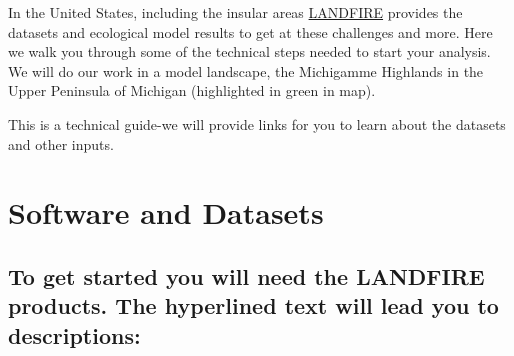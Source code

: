 \documentclass[
]{book}
\begin{document}
In the United States, including the insular areas \href{www.landfire.gov}{LANDFIRE} provides the datasets and ecological model results to get at these challenges and more. Here we walk you through some of the technical steps needed to start your analysis. We will do our work in a model landscape, the Michigamme Highlands in the Upper Peninsula of Michigan (highlighted in green in map).

This is a technical guide-we will provide links for you to learn about the datasets and other inputs.

\hypertarget{softAndData}{%
\chapter{Software and Datasets}\label{softAndData}}

\hypertarget{to-get-started-you-will-need-the-landfire-products.-the-hyperlined-text-will-lead-you-to-descriptions}{%
\section{To get started you will need the LANDFIRE products. The hyperlined text will lead you to descriptions:}\label{to-get-started-you-will-need-the-landfire-products.-the-hyperlined-text-will-lead-you-to-descriptions}}
\end{document}
